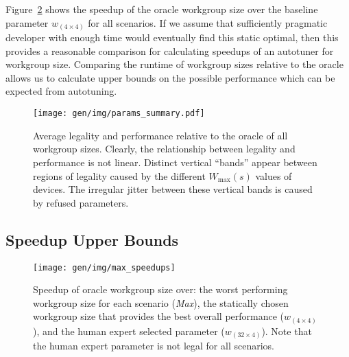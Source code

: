Figure~\ref{fig:speedups} shows the speedup of the oracle workgroup
size over the baseline parameter $w_{(4 \times 4)}$ for all
scenarios. If we assume that sufficiently pragmatic developer with
enough time would eventually find this static optimal, then this
provides a reasonable comparison for calculating speedups of an
autotuner for workgroup size. Comparing the runtime of workgroup sizes
relative to the oracle allows us to calculate upper bounds on the
possible performance which can be expected from autotuning.


\begin{figure}
\centering
\texttt{[image: gen/img/params\_summary.pdf]}
\caption[Workgroup size legality vs.\ performance]{%
  Average legality and performance relative to the oracle of all
  workgroup sizes. Clearly, the relationship between legality and
  performance is not linear. Distinct vertical ``bands'' appear
  between regions of legality caused by the different $W_{\max}(s)$
  values of devices. The irregular jitter between these vertical bands
  is caused by refused parameters.%
}
\label{fig:performance-legality}
\end{figure}


\begin{table}
  \parbox{.45\linewidth}{
    \centering
    \scriptsize
    
    \caption[Workgroup sizes with greatest legality]{%
      The 25 workgroup sizes with the greatest legality.%
    }
\label{tab:highest-legality}
  }
  \hfill
  \parbox{.45\linewidth}{
    \centering
    \scriptsize
    
    \caption[Workgroup sizes with greatest performance]{%
      The 25 workgroup sizes with the greatest mean
      performance.%
    }
\label{tab:highest-performance}
  }
\end{table}


\subsection{Speedup Upper Bounds}

\begin{figure}
  \texttt{[image: gen/img/max\_speedups]}
  \caption[Workgroup size speedups]{%
    Speedup of oracle workgroup size over: the worst performing
    workgroup size for each scenario (\emph{Max}), the statically
    chosen workgroup size that provides the best overall performance
    ($w_{(4 \times 4)}$), and the human expert selected parameter
    ($w_{(32 \times 4)}$). Note that the human expert parameter is not
    legal for all scenarios.%
  }
\label{fig:speedups}
\end{figure}


